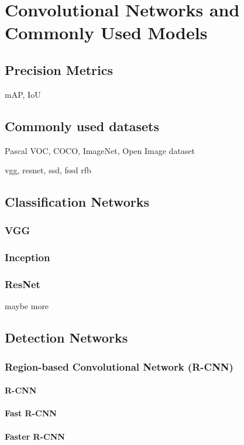 \chapter{Convolutional Networks and Commonly Used Models}
\label{chapt:models}
\section{Precision Metrics}
mAP, IoU

\section{Commonly used datasets}
\label{datasets}
Pascal VOC, COCO, ImageNet, Open Image dataset

 vgg, resnet, ssd, fssd rfb

\section{Classification Networks}
\subsection{VGG}
\label{VGG}
\subsection{Inception}
\label{inception}
\subsection{ResNet}
\label{resnet}
maybe more

\section{Detection Networks}

\subsection{Region-based Convolutional Network (R-CNN)}
\subsubsection{R-CNN}
\subsubsection{Fast R-CNN}
\subsubsection{Faster R-CNN}

